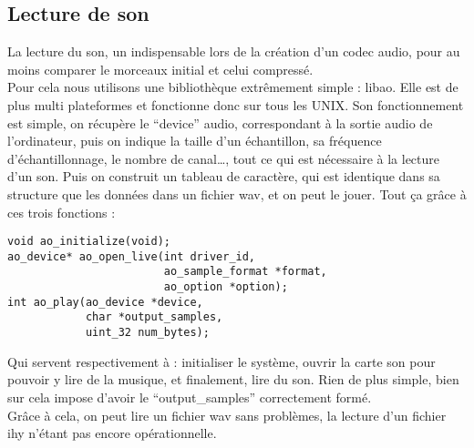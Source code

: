 \documentclass[a4paper,12pt]{article}
\begin{document}
	\subsection{Lecture de son}
La lecture du son, un indispensable lors de la création d'un codec
audio, pour au moins comparer le morceaux initial et celui compressé.\\
Pour cela nous utilisons une bibliothèque extrêmement simple : libao.
Elle est de plus multi plateformes et fonctionne donc sur tous les UNIX.
Son fonctionnement est simple, on récupère le ``device'' audio,
correspondant à la sortie audio de l'ordinateur, puis on indique la
taille d'un échantillon, sa fréquence d'échantillonnage, le nombre de
canal\ldots, tout ce qui est nécessaire à la lecture d'un son. Puis on
construit un tableau de caractère, qui est identique dans sa structure
que les données dans un fichier wav, et on peut le jouer. Tout ça grâce
à ces trois fonctions :
\newpage
\begin{verbatim}
void ao_initialize(void);
ao_device* ao_open_live(int driver_id,
                        ao_sample_format *format,
                        ao_option *option);
int ao_play(ao_device *device,
            char *output_samples,
            uint_32 num_bytes);
\end{verbatim}
Qui servent respectivement à : initialiser le système, ouvrir la carte
son pour pouvoir y lire de la musique, et finalement, lire du son. Rien
de plus simple, bien sur cela impose d'avoir le ``output\_samples''
correctement formé.\\
Grâce à cela, on peut lire un fichier wav sans problèmes, la lecture
d'un fichier ihy n'étant pas encore opérationnelle.\\
\end{document}
